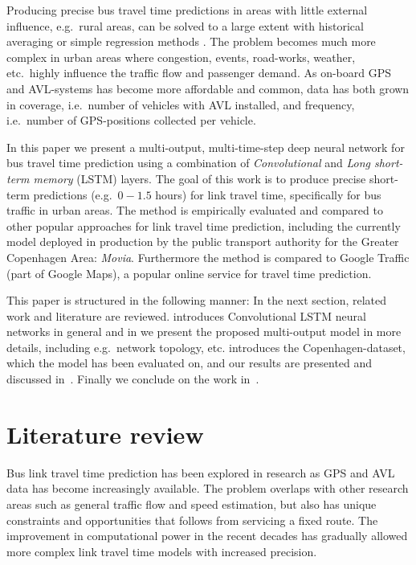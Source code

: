 \documentclass[preprint,11pt,5p,twocolumn]{elsarticle}
\begin{document}
Producing precise bus travel time predictions in areas with little external influence, e.g.\ rural areas, can be solved to a large extent with historical averaging or simple regression methods \cite{Williams2003,Altinkaya2013}. The problem becomes much more complex in urban areas where congestion, events, road-works, weather, etc.\ highly influence the traffic flow and passenger demand. As on-board GPS and AVL-systems has become more affordable and common, data has both grown in coverage, i.e.\ number of vehicles with AVL installed, and frequency, i.e.\ number of GPS-positions collected per vehicle.

In this paper we present a multi-output, multi-time-step deep neural network for bus travel time prediction using a combination of \emph{Convolutional} and \emph{Long short-term memory} (LSTM) \cite{Lstm1,Lstm2} layers. The goal of this work is to produce precise short-term predictions (e.g.\ $0-1.5$ hours) for link travel time, specifically for bus traffic in urban areas. The method is empirically evaluated and compared to other popular approaches for link travel time prediction, including the currently model deployed in production by the public transport authority for the Greater Copenhagen Area: \emph{Movia}. Furthermore the method is compared to Google Traffic (part of Google Maps), a popular online service for travel time prediction. 

This paper is structured in the following manner: In the next section, related work and literature are reviewed.  introduces Convolutional LSTM neural networks in general and in  we present the proposed multi-output model in more details, including e.g.\ network topology, etc.  introduces the Copenhagen-dataset, which the model has been evaluated on, and our results are presented and discussed in~. Finally we conclude on the work in~.

\section{Literature review}
Bus link travel time prediction has been explored in research as GPS and AVL data has become increasingly available. The problem overlaps with other research areas such as general traffic flow and speed estimation, but also has unique constraints and opportunities that follows from servicing a fixed route. The improvement in computational power in the recent decades has gradually allowed more complex link travel time models with increased precision.
\end{document}
